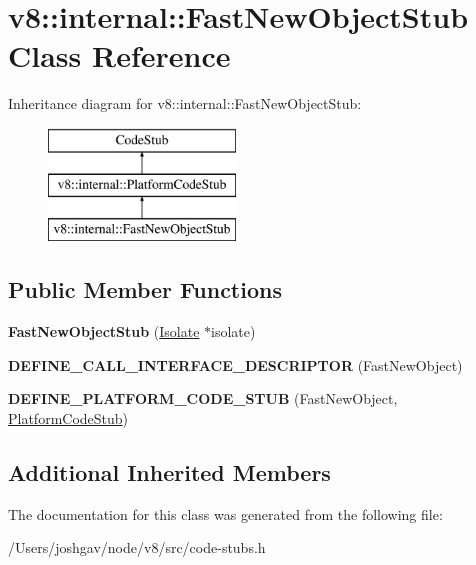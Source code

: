 \hypertarget{classv8_1_1internal_1_1_fast_new_object_stub}{}\section{v8\+:\+:internal\+:\+:Fast\+New\+Object\+Stub Class Reference}
\label{classv8_1_1internal_1_1_fast_new_object_stub}
Inheritance diagram for v8\+:\+:internal\+:\+:Fast\+New\+Object\+Stub\+:\begin{figure}[H]
\begin{center}
\leavevmode
\includegraphics[height=3.000000cm]{classv8_1_1internal_1_1_fast_new_object_stub}
\end{center}
\end{figure}
\subsection*{Public Member Functions}
\begin{DoxyCompactItemize}
\item 
{\bfseries Fast\+New\+Object\+Stub} (\hyperlink{classv8_1_1internal_1_1_isolate}{Isolate} $\ast$isolate)\hypertarget{classv8_1_1internal_1_1_fast_new_object_stub_ac0e1495abfffa8da1f5f620e81202cb5}{}\label{classv8_1_1internal_1_1_fast_new_object_stub_ac0e1495abfffa8da1f5f620e81202cb5}

\item 
{\bfseries D\+E\+F\+I\+N\+E\+\_\+\+C\+A\+L\+L\+\_\+\+I\+N\+T\+E\+R\+F\+A\+C\+E\+\_\+\+D\+E\+S\+C\+R\+I\+P\+T\+OR} (Fast\+New\+Object)\hypertarget{classv8_1_1internal_1_1_fast_new_object_stub_af21dd6cce9f2ade3001e701254035b42}{}\label{classv8_1_1internal_1_1_fast_new_object_stub_af21dd6cce9f2ade3001e701254035b42}

\item 
{\bfseries D\+E\+F\+I\+N\+E\+\_\+\+P\+L\+A\+T\+F\+O\+R\+M\+\_\+\+C\+O\+D\+E\+\_\+\+S\+T\+UB} (Fast\+New\+Object, \hyperlink{classv8_1_1internal_1_1_platform_code_stub}{Platform\+Code\+Stub})\hypertarget{classv8_1_1internal_1_1_fast_new_object_stub_a02df701c7df831b0b0bf8185d0317d30}{}\label{classv8_1_1internal_1_1_fast_new_object_stub_a02df701c7df831b0b0bf8185d0317d30}

\end{DoxyCompactItemize}
\subsection*{Additional Inherited Members}


The documentation for this class was generated from the following file\+:\begin{DoxyCompactItemize}
\item 
/\+Users/joshgav/node/v8/src/code-\/stubs.\+h\end{DoxyCompactItemize}
